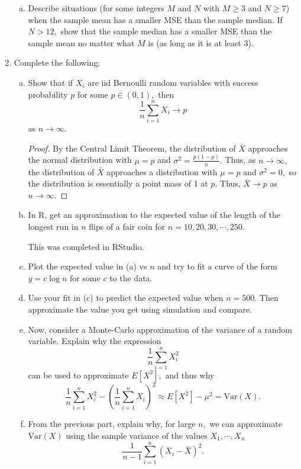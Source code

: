 \documentclass{article}
\newcommand{\var}{\mathrm{Var}}
\begin{document}
\begin{enumerate}
\begin{enumerate}[(a)]
			\item Describe situations (for some integers $M$ and $N$ with $M\ge3$ and $N\ge7$) when the sample mean has a smaller MSE than the sample median. If $N>12,$ show that the sample median has a smaller MSE than the sample mean no matter what $M$ is (as long as it is at least 3).

		\end{enumerate}

	\item Complete the following:
		\begin{enumerate}[(a)]
			\item Show that if $X_i$ are iid Bernoulli random variables with success probability $p$ for some $p\in(0, 1),$ then \[\frac{1}{n}\sum_{i=1}^n X_i\to p\] as $n\to\infty.$
				\begin{proof}
					By the Central Limit Theorem, the distribution of $\bar{X}$ approaches the normal distribution with $\mu=p$ and $\sigma^2=\frac{p(1-p)}{n}.$ Thus, as $n\to\infty,$ the distribution of $\bar{X}$ approaches a distribution with $\mu=p$ and $\sigma^2=0,$ so the distribution is essentially a point mass of 1 at $p.$ Thus, $\bar{X}\to p$ as $n\to\infty.$
					
				\end{proof}

			\item In R, get an approximation to the expected value of the length of the longest run in $n$ flips of a fair coin for $n=10, 20, 30, \cdots, 250.$
				\begin{answer*}
					This was completed in RStudio. 
				\end{answer*}

			\item Plot the expected value in (a) vs $n$ and try to fit a curve of the form $y=c\log n$ for some $c$ to the data.

			\item Use your fit in (c) to predict the expected value when $n=500.$ Then approximate the value you get using simulation and compare.
				
			\item Now, consider a Monte-Carlo approximation of the variance of a random variable. Explain why the expression \[\frac{1}{n}\sum_{i=1}^n X_i^2\] can be used to approximate $E[X^2],$ and thus why \[\frac{1}{n}\sum_{i=1}^n X_i^2 - \left( \frac{1}{n}\sum_{i=1}^n X_i \right)^2 \approx E[X^2]-\mu^2=\var(X).\]

			\item From the previous part, explain why, for large $n,$ we can approximate $\var(X)$ using the sample variance of the values $X_1, \cdots, X_n$ \[\frac{1}{n-1}\sum_{i=1}^n (X_i-\bar{X})^2.\]


\end{enumerate}
\end{enumerate}
\end{document}
